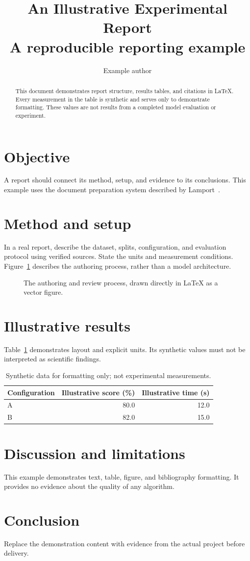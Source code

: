 \documentclass[10pt,a4paper]{article}
\title{An Illustrative Experimental Report\\\large A reproducible reporting example}
\author{Example author}
\date{}
\begin{document}
\maketitle
\begin{abstract}
This document demonstrates report structure, results tables, and citations in LaTeX.
Every measurement in the table is synthetic and serves only to demonstrate formatting.
These values are not results from a completed model evaluation or experiment.
\end{abstract}
\section{Objective}
A report should connect its method, setup, and evidence to its conclusions.
This example uses the document preparation system described by Lamport~\cite{lamport1994}.
\section{Method and setup}
In a real report, describe the dataset, splits, configuration, and evaluation protocol
using verified sources. State the units and measurement conditions.
Figure~\ref{fig:workflow} describes the authoring process, rather than a model architecture.
\begin{figure}[ht]
\centering
{}
\caption{The authoring and review process, drawn directly in LaTeX as a vector figure.}
\label{fig:workflow}
\end{figure}
\section{Illustrative results}
Table~\ref{tab:results} demonstrates layout and explicit units.
Its synthetic values must not be interpreted as scientific findings.
\begin{table}[ht]
\centering
\caption{Synthetic data for formatting only; not experimental measurements.}
\label{tab:results}
\begin{tabular}{lrr}
\toprule
Configuration & Illustrative score (\%) & Illustrative time (s) \\
\midrule
A & 80.0 & 12.0 \\
B & 82.0 & 15.0 \\
\bottomrule
\end{tabular}
\end{table}
\section{Discussion and limitations}
This example demonstrates text, table, figure, and bibliography formatting.
It provides no evidence about the quality of any algorithm.
\section{Conclusion}
Replace the demonstration content with evidence from the actual project before delivery.


\end{document}
